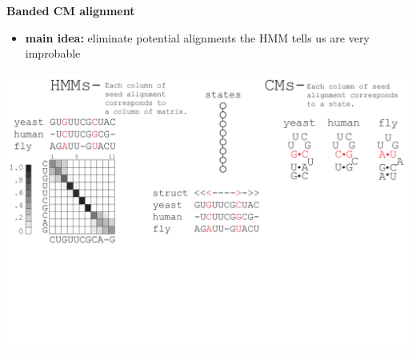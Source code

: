 \documentclass[landscape]{slides}
\begin{document}
\begin{slide}
\begin{center}
\large
\textbf{Banded CM alignment}
\end{center}
\medskip
\small
\begin{itemize}
\item
\textbf{main idea:} eliminate potential alignments the HMM tells us are very improbable
\end{itemize}
\begin{center}
\includegraphics[width=8in]{figs/post_hmm_to_cm_map2_layer2}
\end{center}
\vfill
\end{slide}
\end{document}
